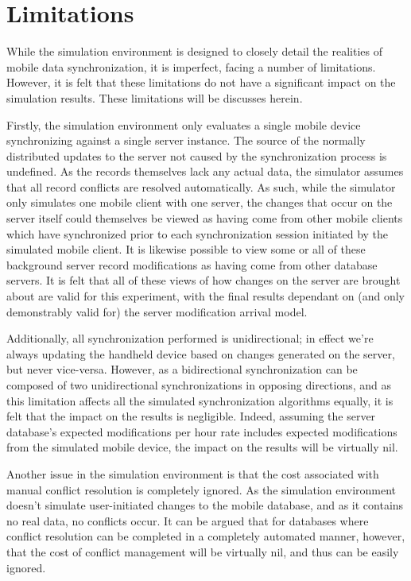 \section{Limitations}\label{limitations}

While the simulation environment is designed to closely detail the realities of mobile data synchronization, it is imperfect, facing a number of limitations.  However, it is felt that these limitations do not have a significant impact on the simulation results.  These limitations will be discusses herein.

Firstly, the simulation environment only evaluates a single mobile device synchronizing against a single server instance.  The source of the normally distributed updates to the server not caused by the synchronization process is undefined.  As the records themselves lack any actual data, the simulator assumes that all record conflicts are resolved automatically.  As such, while the simulator only simulates one mobile client with one server, the changes that occur on the server itself could themselves be viewed as having come from other mobile clients which have synchronized prior to each synchronization session initiated by the simulated mobile client.  It is likewise possible to view some or all of these background server record modifications as having come from other database servers.  It is felt that all of these views of how changes on the server are brought about are valid for this experiment, with the final results dependant on (and only demonstrably valid for) the server modification arrival model.

Additionally, all synchronization performed is unidirectional; in effect we're always updating the handheld device based on changes generated on the server, but never vice-versa.  However, as a bidirectional synchronization can be composed of two unidirectional synchronizations in opposing directions, and as this limitation affects all the simulated synchronization algorithms equally, it is felt that the impact on the results is negligible.  Indeed, assuming the server database's expected modifications per hour rate includes expected modifications from the simulated mobile device, the impact on the results will be virtually nil.

Another issue in the simulation environment is that the cost associated with manual conflict resolution is completely ignored.  As the simulation environment doesn't simulate user-initiated changes to the mobile database, and as it contains no real data, no conflicts occur.  It can be argued that for databases where conflict resolution can be completed in a completely automated manner, however, that the cost of conflict management will be virtually nil, and thus can be easily ignored.

